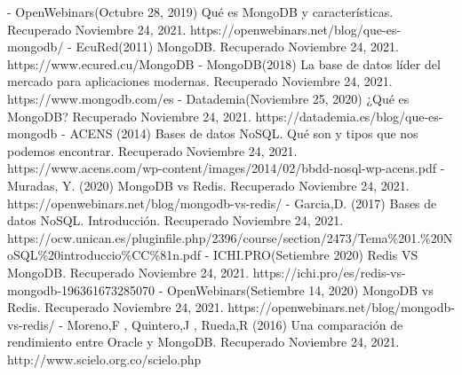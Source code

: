 \documentclass[twoside,twocolumn]{article}
\begin{document}
\begin{thebibliography}{XXX0000}
	\bibitem - OpenWebinars(Octubre 28, 2019) Qué es MongoDB y características. Recuperado Noviembre 24, 2021. https://openwebinars.net/blog/que-es-mongodb/ 
	\bibitem - EcuRed(2011) MongoDB. Recuperado Noviembre 24, 2021. https://www.ecured.cu/MongoDB 
    \bibitem - MongoDB(2018) La base de datos líder del mercado para aplicaciones modernas.  Recuperado Noviembre 24, 2021. https://www.mongodb.com/es 
    \bibitem - Datademia(Noviembre 25, 2020) ¿Qué es MongoDB?  Recuperado Noviembre 24, 2021. https://datademia.es/blog/que-es-mongodb 
    \bibitem - ACENS (2014) Bases de datos NoSQL. Qué son y tipos que nos podemos encontrar. Recuperado Noviembre 24, 2021. https://www.acens.com/wp-content/images/2014/02/bbdd-nosql-wp-acens.pdf 
    \bibitem - Muradas, Y. (2020) MongoDB vs Redis. Recuperado Noviembre 24, 2021. https://openwebinars.net/blog/mongodb-vs-redis/ 
    \bibitem - Garcia,D. (2017) Bases de datos NoSQL. Introducción. Recuperado Noviembre 24, 2021. https://ocw.unican.es/pluginfile.php/2396/course/section/2473/Tema\%201.\%20NoSQL\%20introduccio\%CC\%81n.pdf 
    \bibitem - ICHI.PRO(Setiembre 2020) Redis VS MongoDB.   Recuperado Noviembre 24, 2021. https://ichi.pro/es/redis-vs-mongodb-196361673285070 
    \bibitem - OpenWebinars(Setiembre 14, 2020) MongoDB vs Redis. Recuperado Noviembre 24, 2021. https://openwebinars.net/blog/mongodb-vs-redis/ 
    \bibitem - Moreno,F , Quintero,J , Rueda,R (2016) Una comparación de rendimiento entre Oracle y MongoDB. Recuperado Noviembre 24, 2021. http://www.scielo.org.co/scielo.php

	\end{thebibliography}

\end{document}

